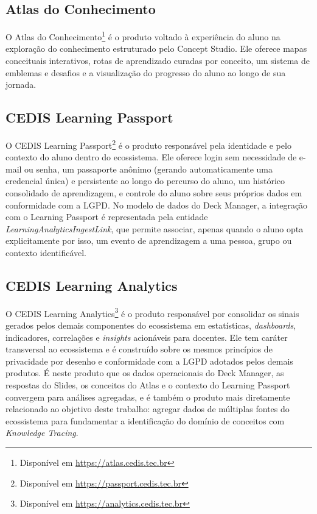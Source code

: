 \subsection{Atlas do Conhecimento}
\label{subsec:atlas}

O Atlas do Conhecimento\footnote{Disponível em \url{https://atlas.cedis.tec.br}} é o produto
voltado à experiência do aluno na exploração do conhecimento estruturado
pelo Concept Studio. Ele oferece mapas conceituais interativos, rotas de
aprendizado curadas por conceito, um sistema de emblemas e desafios e a visualização do
progresso do aluno ao longo de sua jornada.

\subsection{CEDIS Learning Passport}
\label{subsec:learning-passport}

O CEDIS Learning Passport\footnote{Disponível em \url{https://passport.cedis.tec.br}} é o
produto responsável pela identidade e pelo contexto do aluno dentro do
ecossistema. Ele oferece login sem necessidade de e-mail ou senha, um
passaporte anônimo (gerando automaticamente uma credencial única) e persistente
ao longo do percurso do aluno, um histórico consolidado de aprendizagem, e controle do aluno sobre
seus próprios dados em conformidade com a LGPD. No modelo de dados
do Deck Manager, a integração com o Learning Passport é representada pela
entidade \textit{LearningAnalyticsIngestLink}, que permite associar,
apenas quando o aluno opta explicitamente por isso, um evento de
aprendizagem a uma pessoa, grupo ou contexto identificável.

\subsection{CEDIS Learning Analytics}
\label{subsec:learning-analytics}

O CEDIS Learning Analytics\footnote{Disponível em \url{https://analytics.cedis.tec.br}} é o
produto responsável por consolidar os sinais gerados pelos demais
componentes do ecossistema em estatísticas, \textit{dashboards},
indicadores, correlações e \textit{insights} acionáveis para docentes.
Ele tem caráter transversal ao ecossistema e é construído sobre os mesmos
princípios de privacidade por desenho e conformidade com a LGPD adotados
pelos demais produtos. É neste produto que os dados operacionais do Deck
Manager, as respostas do Slides, os conceitos do Atlas e o contexto do
Learning Passport convergem para análises agregadas, e é também o produto
mais diretamente relacionado ao objetivo deste trabalho: agregar dados de
múltiplas fontes do ecossistema para fundamentar a identificação do domínio
de conceitos com \textit{Knowledge Tracing}.

